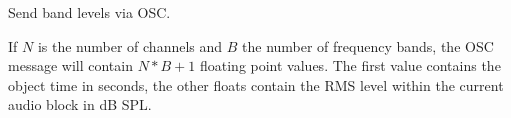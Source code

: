 Send band levels via OSC.



If $N$ is the number of channels and $B$ the number of frequency
bands, the OSC message will contain $N*B+1$ floating point values. The
first value contains the object time in seconds, the other floats
contain the RMS level within the current audio block in dB SPL.
